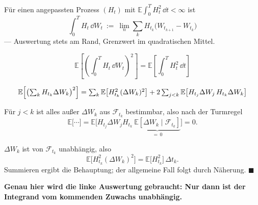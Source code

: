 \begin{definition}
Für einen angepassten Prozess $(H_t)$ mit $\mathbb{E}\int_0^T H_t^{2}\,\dd t < \infty$ ist
\[ \int_0^T H_t\,\dd W_t \ :=\ \lim_{n} \sum_k H_{t_k}\bigl(W_{t_{k+1}}-W_{t_k}\bigr) \]
--- Auswertung stets am  Rand, Grenzwert im quadratischen Mittel.
\end{definition}

\begin{merksatz}
\[ \mathbb{E}\left[\left(\int_0^T H_t\,\dd W_t\right)^{2}\right] = \mathbb{E}\left[\int_0^T H_t^{2}\,\dd t\right] \]

\[ \mathbb{E}\Bigl[\bigl(\textstyle\sum_k H_{t_k}\Delta W_k\bigr)^{2}\Bigr] = \sum_k \mathbb{E}\bigl[H_{t_k}^{2}(\Delta W_k)^{2}\bigr] + 2\sum_{j<k} \mathbb{E}\bigl[H_{t_j}\Delta W_j\,H_{t_k}\Delta W_k\bigr] \]

 Für $j < k$ ist alles außer $\Delta W_k$ aus $\mathcal F_{t_k}$ bestimmbar, also nach der Turmregel
\[ \mathbb{E}\bigl[\cdots\bigr] = \mathbb{E}\bigl[H_{t_j}\Delta W_j H_{t_k}\ \underbrace{\mathbb{E}[\Delta W_k \mid \mathcal F_{t_k}]}_{=\,0}\bigr] = 0 . \]

 $\Delta W_k$ ist von $\mathcal F_{t_k}$ unabhängig, also
\[ \mathbb{E}\bigl[H_{t_k}^{2}(\Delta W_k)^{2}\bigr] = \mathbb{E}\bigl[H_{t_k}^{2}\bigr]\,\Delta t_k . \]
Summieren ergibt die Behauptung; der allgemeine Fall folgt durch Näherung. $\blacksquare$

\begin{center}
\begin{minipage}{0.9\textwidth}
\textbf{Genau hier wird die linke Auswertung gebraucht: Nur dann ist der Integrand vom kommenden Zuwachs unabhängig.}
\end{minipage}
\end{center}

\begin{center}
\begin{minipage}{0.88\textwidth}
\end{minipage}
\end{center}
\end{merksatz}


